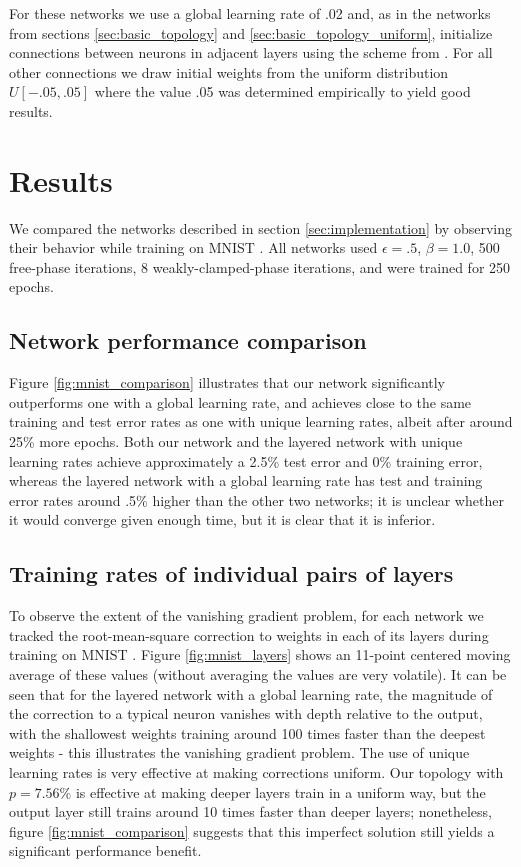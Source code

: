 \documentclass[utf8]{frontiersSCNS}
\begin{document}
For these networks we use a global learning rate of .02 and, as in the networks from sections \ref{sec:basic_topology} and \ref{sec:basic_topology_uniform}, initialize connections between neurons in adjacent layers using the scheme from \citep{glorot2010}. For all other connections we draw initial weights from the uniform distribution $U[-.05, .05]$ where the value .05 was determined empirically to yield good results.

\section{Results}

We compared the networks described in section \ref{sec:implementation} by observing their behavior while training on MNIST \citep{mnist1998}. All networks used $\epsilon=.5$, $\beta=1.0$, 500 free-phase iterations, 8 weakly-clamped-phase iterations, and were trained for 250 epochs.

\subsection{Network performance comparison}
\label{sec:network_performance}

Figure \ref{fig:mnist_comparison} illustrates that our network significantly outperforms one with a global learning rate, and achieves close to the same training and test error rates as one with unique learning rates, albeit after around 25\% more epochs. Both our network and the layered network with unique learning rates achieve approximately a 2.5\% test error and 0\% training error, whereas the layered network with a global learning rate has test and training error rates around .5\% higher than the other two networks; it is unclear whether it would converge given enough time, but it is clear that it is inferior.

\subsection{Training rates of individual pairs of layers}
\label{sec:mnist_perlayer}

To observe the extent of the vanishing gradient problem, for each network we tracked the root-mean-square correction to weights in each of its layers during training on MNIST \citep{mnist1998}. Figure \ref{fig:mnist_layers} shows an 11-point centered moving average of these values (without averaging the values are very volatile). It can be seen that for the layered network with a global learning rate, the magnitude of the correction to a typical neuron vanishes with depth relative to the output, with the shallowest weights training around 100 times faster than the deepest weights - this illustrates the vanishing gradient problem. The use of unique learning rates is very effective at making corrections uniform. Our topology with $p=7.56\%$ is effective at making deeper layers train in a uniform way, but the output layer still trains around 10 times faster than deeper layers; nonetheless, figure \ref{fig:mnist_comparison} suggests that this imperfect solution still yields a significant performance benefit.
\end{document}
